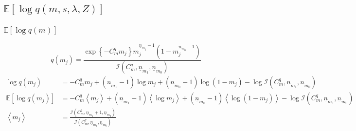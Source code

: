 \documentclass[11pt]{article}
\begin{document}
\subsection{$\mathbb{E}\left[\log q\left(m, s, \lambda, Z\right)\right]$}
\subsubsection{$\mathbb{E}\left[\log q\left(m\right)\right] $}
$$
  q\left(m_{j}\right) = \frac{\exp \left\{-C_{m}^{q}m_{j} \right\}m_{j}^{\underline{n}_{m_{j}}-1}\left(1-m_{j}^{\underline{n}_{m_{0}}-1}\right)}{\mathcal{I}\left(C_{m}^{q}, \underline{n}_{m_{1}}, \underline{n}_{m_{0}}\right)}
$$
\begin{align*}
  \log q\left(m_{j}\right) &= -C_{m}^{q}m_{j} +\left(\underline{n}_{m_{1}}-1\right)\log m_{j} + \left(\underline{n}_{m_{0}}-1\right)\log \left(1-m_{j}\right) - \log \mathcal{I}\left(C_{m}^{q}, \underline{n}_{m_{1}}, \underline{n}_{m_{0}}\right)\\
  \mathbb{E}\left[\log q\left(m_{j}\right)\right] &= -C_{m}^{q}\left\langle m_{j}\right\rangle + \left(\underline{n}_{m_{1}}-1\right)\left\langle \log m_{j}\right\rangle + \left(\underline{n}_{m_{0}}-1\right)\left\langle \log \left(1-m_{j}\right)\right\rangle - \log \mathcal{I}\left(C_{m}^{q}, \underline{n}_{m_{1}}, \underline{n}_{m_{0}}\right)\\
  \left\langle m_{j}\right\rangle &= \frac{\mathcal{I}\left(C_{m}^{q}, \underline{n}_{m_{1}}+1, \underline{n}_{m_{0}}\right)}{\mathcal{I}\left(C_{m}^{q}, \underline{n}_{m_{1}}, \underline{n}_{m_{0}}\right)}
\end{align*}
\end{document}
